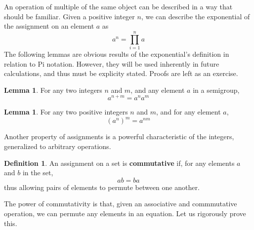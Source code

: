 \documentclass[12pt]{amsbook}
\theoremstyle{definition}
\newtheorem{lemma}[theorem]{Lemma}
\newtheorem{definition}{Definition}
\begin{document}
An operation of multiple of the same object can be described in a way that should be familiar. Given a positive integer $n$, we can describe the exponential of the assignment on an element $a$ as
%
\[ a^n = \prod_{i = 1}^n a \]
%
The following lemmas are obvious results of the exponential's definition in relation to Pi notation. However, they will be used inherently in future calculations, and thus must be explicity stated. Proofs are left as an exercise.

\begin{lemma} For any two integers $n$ and $m$, and any element $a$ in a semigroup,
\[ a^{n+m} = a^n a^m \]
\end{lemma}

\begin{lemma}
    For any two positive integers $n$ and $m$, and for any element $a$,
    \[ (a^n)^m = a^{nm} \]
\end{lemma}

Another property of assignments is a powerful characteristic of the integers, generalized to arbitrary operations.

\begin{definition} An assignment on a set is {\bf commutative} if, for any elements $a$ and $b$ in the set,
%
\[ ab = ba \]
%
thus allowing pairs of elements to permute between one another.
\end{definition}

The power of commutativity is that, given an associative and commmutative operation, we can permute any elements in an equation. Let us rigorously prove this.
\end{document}
